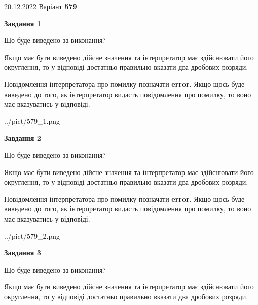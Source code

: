 \documentclass[12pt, ukrainian]{article}
\begin{document}
{20.12.2022 Варіант \No \textbf { 579 }\par}
{
\begin {Large}

{\begin {center}\textbf{Завдання 1}\end {center}}\par
Що буде виведено за виконання? \par

Якщо має бути виведено дійсне значення та інтерпретатор має здійснювати його округлення, 
то у відповіді достатньо правильно вказати два дробових розряди.

Повідомлення інтерпретатора про помилку позначати \textbf{error}.
Якщо щось буде виведено до того, як інтерпретатор видасть повідомлення про помилку, 
то воно має вказуватись у відповіді. \par

\begin{center}
	{../pict/579_1.png}
\end{center}
\newpage

{\begin {center}\textbf{Завдання 2}\end {center}}\par
Що буде виведено за виконання? \par

Якщо має бути виведено дійсне значення та інтерпретатор має здійснювати його округлення, 
то у відповіді достатньо правильно вказати два дробових розряди.

Повідомлення інтерпретатора про помилку позначати \textbf{error}.
Якщо щось буде виведено до того, як інтерпретатор видасть повідомлення про помилку, 
то воно має вказуватись у відповіді. \par

\begin{center}
	{../pict/579_2.png}
\end{center}
\newpage

{\begin {center}\textbf{Завдання 3}\end {center}}\par
Що буде виведено за виконання? \par

Якщо має бути виведено дійсне значення та інтерпретатор має здійснювати його округлення, 
то у відповіді достатньо правильно вказати два дробових розряди.


\end{Large}}
\end{document}
